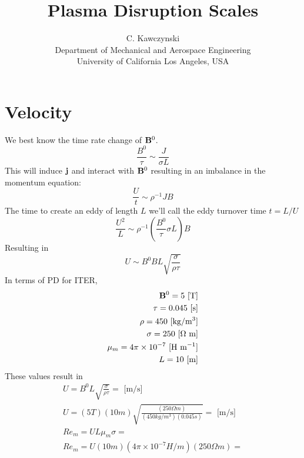 \documentclass[11pt]{article}
\begin{document}
\doublespacing
\title{Plasma Disruption Scales}
\author{C. Kawczynski \\
Department of Mechanical and Aerospace Engineering \\
University of California Los Angeles, USA\\
}
\maketitle

\section{Velocity}
We best know the time rate change of $\mathbf{B}^0$.
\begin{equation}
	\frac{B^0}{\tau} \sim \frac{J}{\sigma L}
\end{equation}
This will induce $\mathbf{j}$ and interact with $\mathbf{B}^0$ resulting in an imbalance in the momentum equation:
\begin{equation}
	\frac{U}{t} \sim \rho^{-1} J B
\end{equation}
The time to create an eddy of length $L$ we'll call the eddy turnover time $t=L/U$
\begin{equation}
	\frac{U^2}{L} \sim \rho^{-1} \left(\frac{B^0}{\tau} \sigma L \right) B
\end{equation}
Resulting in
\begin{equation}
	U \sim {B^0} B L \sqrt{\frac{\sigma}{\rho \tau}}
\end{equation}
In terms of PD for ITER,
\begin{equation}\begin{aligned}
	\mathbf{B}^0 = 5 \text{ [T]} \\
	\tau = 0.045 \text{ [s]} \\
	\rho = 450 \text{ [kg/m$^3$]} \\
	\sigma = 250 \text{ [$\Omega$ m]} \\
	\mu_m = 4 \pi \times 10^{-7} \text{ [H m$^{-1}$]} \\
	L = 10 \text{ [m]} \\
\end{aligned}\end{equation}
These values result in
\begin{equation}\begin{aligned}
	U = B^0 L \sqrt{\frac{\sigma}{\rho \tau}} = \text{ [m/s]} \\
	U = (5 T) (10 m) \sqrt{\frac{(250 \Omega m)}{(450 kg/m^3) (0.045 s)}} = \text{ [m/s]} \\
	Re_m = U L \mu_m \sigma =  \\
	Re_m = U (10 m) (4 \pi \times 10^{-7} H/m) (250 \Omega m) =  \\
\end{aligned}\end{equation}
\end{document}
